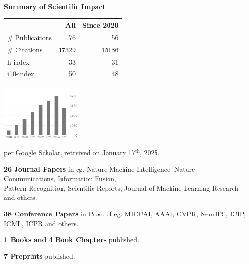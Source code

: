 \headedsection %
{\bf Summary of Scientific Impact}{}{}
{
    \begin{center}
     \begin{minipage}[b][2.4cm][t]{0.4\textwidth}
        \begin{center}
            \begin{tabular}{lrr}
                \hline
                & All & Since 2020\\
                \hline
                \# Publications & 76     & 56    \\
                \# Citations    & 17329  & 15186 \\
                h-index         & 33     & 31    \\
                i10-index       & 50     & 48    \\
                \hline
            \end{tabular} 
    \end{center}
     \end{minipage}
     \begin{minipage}[t][2.4cm][t]{0.4\textwidth}
         \begin{center}
            \includegraphics[height=2.8cm]{./sections/publications-impact-barchart.png}
         \end{center}
     \end{minipage}
    
     {\footnotesize{
        per \href{https://scholar.google.com/citations?user=wpLQuroAAAAJ}{Google Scholar},
        retreived on January 17$^\text{th}$, 2025.
        }
        }

    \end{center}
    \vstep

    \ifdefined\shortcv
        \vstep
        {\bf 26 Journal Papers} in eg. Nature Machine Intelligence, Nature Communications, Information Fusion,\\
        \hspace*{\fill} Pattern Recognition, Scientific Reports, Journal of Machine Learning Research and others.

        {\bf 38 Conference Papers} in Proc. of eg. MICCAI, AAAI, CVPR, NeurIPS, ICIP, ICML, ICPR and others.

        {\bf 1 Books and 4 Book Chapters} published.

        {\bf 7 Preprints} published.
        
    \else
        {}
    \fi

}
